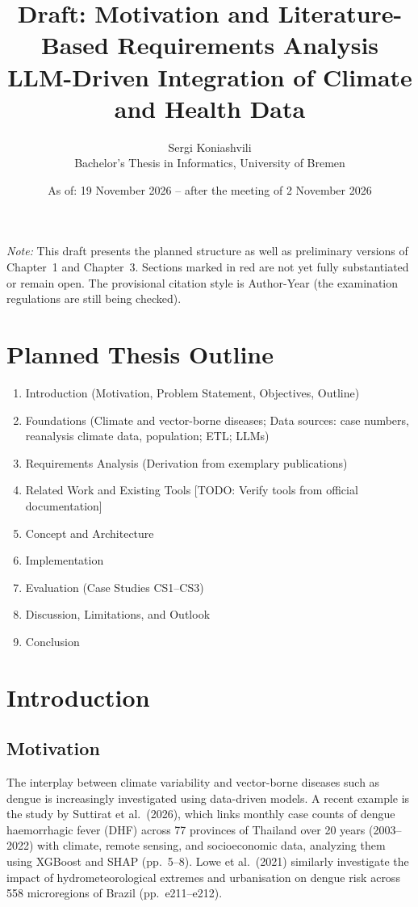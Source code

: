 \documentclass[11pt,a4paper]{article}
\title{Draft: Motivation and Literature-Based Requirements Analysis\\[0.3em]
\large LLM-Driven Integration of Climate and Health Data}
\author{Sergi Koniashvili\\ Bachelor's Thesis in Informatics, University of Bremen}
\date{As of: 19 November 2026 -- after the meeting of 2 November 2026}
\newcommand{\todo}[1]{\textcolor{red!70!black}{[TODO: #1]}}
\begin{document}
\maketitle

\noindent\textit{Note:} This draft presents the planned structure as well as preliminary
versions of Chapter~1 and Chapter~3. Sections marked in red are not yet fully
substantiated or remain open. The provisional citation style is Author-Year (the
examination regulations are still being checked).

\section*{Planned Thesis Outline}
\begin{enumerate}[nosep]
  \item Introduction (Motivation, Problem Statement, Objectives, Outline)
  \item Foundations (Climate and vector-borne diseases; Data sources:
        case numbers, reanalysis climate data, population; ETL; LLMs)
  \item Requirements Analysis (Derivation from exemplary publications)
  \item Related Work and Existing Tools \todo{Verify tools from official documentation}
  \item Concept and Architecture
  \item Implementation
  \item Evaluation (Case Studies CS1--CS3)
  \item Discussion, Limitations, and Outlook
  \item Conclusion
\end{enumerate}

\section{Introduction}

\subsection{Motivation}

The interplay between climate variability and vector-borne diseases such as dengue
is increasingly investigated using data-driven models. A recent example is the
study by Suttirat et al.\ (2026), which links monthly case counts of dengue
haemorrhagic fever (DHF) across 77 provinces of Thailand over 20 years
(2003--2022) with climate, remote sensing, and socioeconomic data, analyzing them
using XGBoost and SHAP (pp.~5--8). Lowe et al.\ (2021) similarly investigate
the impact of hydrometeorological extremes and urbanisation on dengue risk across
558 microregions of Brazil (pp.~e211--e212).
\end{document}
